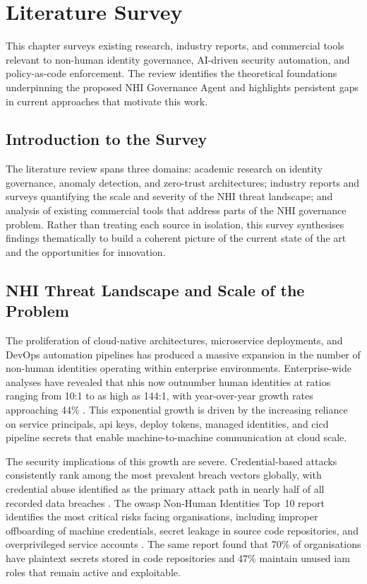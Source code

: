 \chapter{Literature Survey}
This chapter surveys existing research, industry reports, and commercial tools relevant to non-human identity governance, AI-driven security automation, and policy-as-code enforcement. The review identifies the theoretical foundations underpinning the proposed NHI Governance Agent and highlights persistent gaps in current approaches that motivate this work.

\section[Introduction to the Survey]{\textbf{Introduction to the Survey}}
The literature review spans three domains: academic research on identity governance, anomaly detection, and zero-trust architectures; industry reports and surveys quantifying the scale and severity of the NHI threat landscape; and analysis of existing commercial tools that address parts of the NHI governance problem. Rather than treating each source in isolation, this survey synthesises findings thematically to build a coherent picture of the current state of the art and the opportunities for innovation.

\section[NHI Threat Landscape]{\textbf{NHI Threat Landscape and Scale of the Problem}}
The proliferation of cloud-native architectures, microservice deployments, and DevOps automation pipelines has produced a massive expansion in the number of non-human identities operating within enterprise environments. Enterprise-wide analyses have revealed that \glspl{nhi} now outnumber human identities at ratios ranging from 10:1 to as high as 144:1, with year-over-year growth rates approaching 44\% \cite{Entro2025}. This exponential growth is driven by the increasing reliance on service principals, \gls{api} keys, deploy tokens, managed identities, and \gls{cicd} pipeline secrets that enable machine-to-machine communication at cloud scale.

The security implications of this growth are severe. Credential-based attacks consistently rank among the most prevalent breach vectors globally, with credential abuse identified as the primary attack path in nearly half of all recorded data breaches \cite{VerizonDBIR2023}. The \gls{owasp} Non-Human Identities Top~10 report identifies the most critical risks facing organisations, including improper offboarding of machine credentials, secret leakage in source code repositories, and overprivileged service accounts \cite{OWASP2025}. The same report found that 70\% of organisations have plaintext secrets stored in code repositories and 47\% maintain unused \gls{iam} roles that remain active and exploitable.

